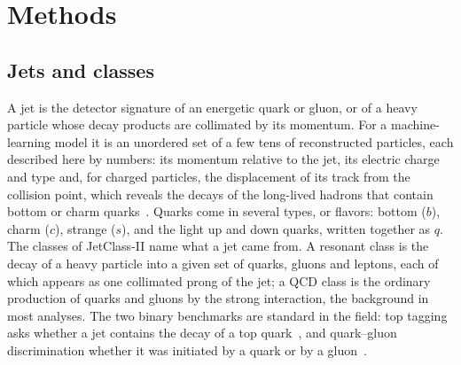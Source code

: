 \section{Methods}\label{sec:methods}

\subsection{Jets and classes}
A jet is the detector signature of an energetic quark or gluon, or of a heavy particle whose decay
products are collimated by its momentum.
For a machine-learning model it is an unordered set of a few tens of reconstructed particles, each
described here by \FillNFeatures{} numbers: its momentum relative to the jet, its electric charge and type and,
for charged particles, the displacement of its track from the collision point, which reveals the
decays of the long-lived hadrons that contain bottom or charm quarks~\cite{cmsbtag,deepjet,gntwo,hfreview}.
Quarks come in several types, or flavors: bottom ($b$), charm ($c$), strange ($s$), and the light
up and down quarks, written together as $q$.
The classes of JetClass-II name what a jet came from.
A resonant class is the decay of a heavy particle into a given set of quarks, gluons and leptons,
each of which appears as one collimated prong of the jet; a QCD class is the ordinary production
of quarks and gluons by the strong interaction, the background in most analyses.
The two binary benchmarks are standard in the field: top tagging asks whether a jet contains the
decay of a top quark~\cite{toptag,deeptop}, and quark--gluon discrimination whether it was initiated by a quark or by a
gluon~\cite{gallicchio,qgcolor,gras}.

